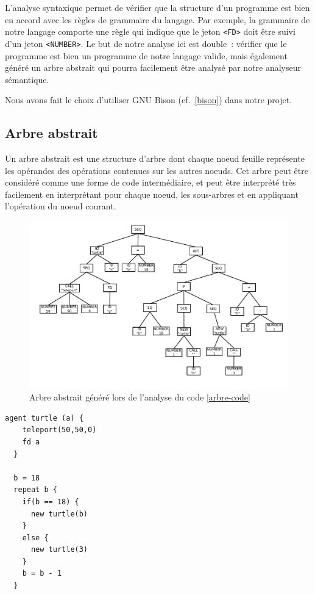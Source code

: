 L'analyse syntaxique permet de vérifier que la structure d'un programme est bien en accord avec les règles de grammaire du langage. Par exemple, la grammaire de notre langage comporte une règle qui indique que le jeton \verb|<FD>| doit être suivi d'un jeton \verb|<NUMBER>|. Le but de notre analyse ici est double~: vérifier que le programme est bien un programme de notre langage valide, mais également généré un arbre abstrait qui pourra facilement être analysé par notre analyseur sémantique.

Nous avons fait le choix d'utiliser GNU Bison (cf.~\ref{bison}) dans notre projet.

\subsection{Arbre abstrait}
Un arbre abstrait est une structure d'arbre dont chaque noeud feuille représente les opérandes des opérations contenues sur les autres noeuds. Cet arbre peut être considéré comme une forme de code intermédiaire, et peut être interprété très facilement en interprétant pour chaque noeud, les sous-arbres et en appliquant l'opération du noeud courant.

\begin{figure}[h!]
\centering
\includegraphics[scale=0.8]{doc/report/img/arbre-abstrait}
\caption{\label{arbre-abstrait} Arbre abstrait généré lors de l'analyse du code \ref{arbre-code}}
\end{figure}
\begin{lstlisting}[language=Stibbons,label=arbre-code,caption=Exemple de code Stibbons]
  agent turtle (a) {
    teleport(50,50,0)
    fd a
  }

  b = 18
  repeat b {
    if(b == 18) {
      new turtle(b)
    }
    else {
      new turtle(3)
    }
    b = b - 1
  }
\end{lstlisting}


